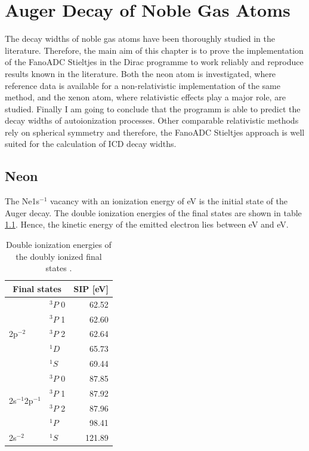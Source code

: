 \chapter{Auger Decay of Noble Gas Atoms}
The decay widths of noble gas atoms have been thoroughly studied in the
literature. Therefore, the main aim of this chapter is to prove the implementation
of the FanoADC Stieltjes in the Dirac programme \cite{DIRAC13} to work
reliably and reproduce results known in the literature. Both the neon atom is
investigated, where reference data is available for a non-relativistic
implementation of the same method, and the xenon atom, where relativistic effects
play a major role, are studied.
Finally I am going to conclude that the programm is able to predict
the decay widths of autoionization processes. Other comparable relativistic methods
rely on spherical symmetry and therefore, the FanoADC Stieltjes approach
is well suited for the calculation of \ac{ICD} decay widths.


\section{Neon}

The Ne1s$^{-1}$ vacancy with an ionization energy of \unit[xxx]{eV} is
the initial state of the Auger decay. The double ionization energies of
the final states are shown in table \ref{table:Ne_dips}. Hence, the
kinetic energy of the emitted electron lies between
\unit[]{eV} and \unit[]{eV}.

\begin{table}[h]
  \centering
  \caption{Double ionization energies of the doubly ionized final states
           \cite{NIST2014}.}
  \begin{tabular}{llr}
   \toprule
   \multicolumn{2}{c}{Final states} & \acs{SIP} [eV]\\
   \midrule
   \multirow{5}{*}{2p$^{-2}$} & $^3P$ 0        & 62.52 \\
                              & $^3P$ 1        & 62.60 \\
                              & $^3P$ 2        & 62.64 \\
                              & $^1D$          & 65.73 \\
                              & $^1S$          & 69.44 \\
   \midrule
 \multirow{4}{*}{2s$^{-1}$2p$^{-1}$} & $^3P$ 0 & 87.85 \\
                              & $^3P$ 1        & 87.92 \\
                              & $^3P$ 2        & 87.96 \\
                              & $^1P$          & 98.41 \\
   \midrule                                    
      2s$^{-2}$               & $^1S$          &121.89 \\
   \bottomrule
  \end{tabular}
  \label{table:Ne_dips}
\end{table}

